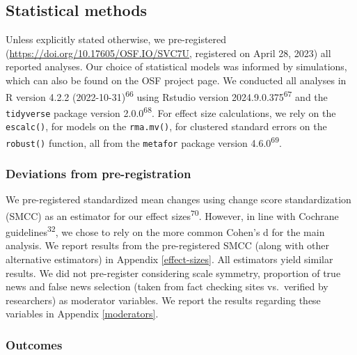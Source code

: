 \documentclass[
  doc,floatsintext]{apa6}
\begin{document}
\subsection{Statistical methods}\label{statistical-methods}

Unless explicitly stated otherwise, we pre-registered (\url{https://doi.org/10.17605/OSF.IO/SVC7U}, registered on April 28, 2023) all reported analyses. Our choice of statistical models was informed by simulations, which can also be found on the OSF project page. We conducted all analyses in R version 4.2.2 (2022-10-31)\textsuperscript{66} using Rstudio version 2024.9.0.375\textsuperscript{67} and the \texttt{tidyverse} package version 2.0.0\textsuperscript{68}. For effect size calculations, we rely on the \texttt{escalc()}, for models on the \texttt{rma.mv()}, for clustered standard errors on the \texttt{robust()} function, all from the \texttt{metafor} package version 4.6.0\textsuperscript{69}.

\subsubsection{Deviations from pre-registration}\label{deviations-from-pre-registration}

We pre-registered standardized mean changes using change score standardization (SMCC) as an estimator for our effect sizes\textsuperscript{70}. However, in line with Cochrane guidelines\textsuperscript{32}, we chose to rely on the more common Cohen's d for the main analysis. We report results from the pre-registered SMCC (along with other alternative estimators) in Appendix \ref{effect-sizes}. All estimators yield similar results. We did not pre-register considering scale symmetry, proportion of true news and false news selection (taken from fact checking sites vs.~verified by researchers) as moderator variables. We report the results regarding these variables in Appendix \ref{moderators}.

\subsubsection{Outcomes}\label{outcomes}
\end{document}
